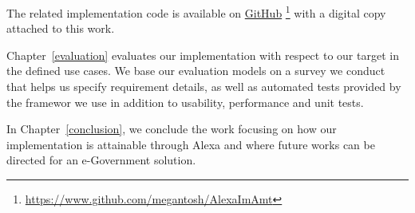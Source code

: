The related implementation code is available on \href{https://www.github.com/megantosh/AlexaImAmt}{GitHub} \footnote{\url{https://www.github.com/megantosh/AlexaImAmt} } with a digital copy attached to this work. 

Chapter~\ref{evaluation} evaluates our implementation with respect to our target in the defined %
use cases. We base our evaluation models on a survey we conduct that helps us specify requirement details, as well as automated tests provided by the framewor we use in addition to usability, performance and unit tests. 

In Chapter~\ref{conclusion}, we conclude the work focusing on how our implementation %
is attainable through Alexa and where future works can be directed for an e-Government solution.

